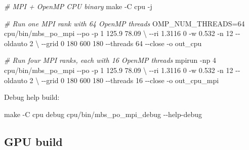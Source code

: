 \documentclass[
  10pt,
  a4paper,
]{article}
\newenvironment{Shaded}{}{}
\newcommand{\AttributeTok}[1]{\textcolor[rgb]{0.49,0.56,0.16}{#1}}
\newcommand{\CommentTok}[1]{\textcolor[rgb]{0.38,0.63,0.69}{\textit{#1}}}
\newcommand{\DataTypeTok}[1]{\textcolor[rgb]{0.56,0.13,0.00}{#1}}
\newcommand{\ExtensionTok}[1]{#1}
\newcommand{\FunctionTok}[1]{\textcolor[rgb]{0.02,0.16,0.49}{#1}}
\newcommand{\NormalTok}[1]{#1}
\newcommand{\OperatorTok}[1]{\textcolor[rgb]{0.40,0.40,0.40}{#1}}
\newcommand{\VariableTok}[1]{\textcolor[rgb]{0.10,0.09,0.49}{#1}}
\begin{document}
\begin{Shaded}
\begin{Highlighting}[]
\CommentTok{\# MPI + OpenMP CPU binary}
\FunctionTok{make} \AttributeTok{{-}C}\NormalTok{ cpu }\AttributeTok{{-}j}

\CommentTok{\# Run one MPI rank with 64 OpenMP threads}
\VariableTok{OMP\_NUM\_THREADS}\OperatorTok{=}\NormalTok{64 }\ExtensionTok{cpu/bin/mbs\_po\_mpi} \AttributeTok{{-}{-}po} \AttributeTok{{-}p}\NormalTok{ 1 125.9 78.09 }\DataTypeTok{\textbackslash{}}
    \AttributeTok{{-}{-}ri}\NormalTok{ 1.3116 0 }\AttributeTok{{-}w}\NormalTok{ 0.532 }\AttributeTok{{-}n}\NormalTok{ 12 }\AttributeTok{{-}{-}oldauto}\NormalTok{ 2 }\DataTypeTok{\textbackslash{}}
    \AttributeTok{{-}{-}grid}\NormalTok{ 0 180 600 180 }\AttributeTok{{-}{-}threads}\NormalTok{ 64 }\AttributeTok{{-}{-}close} \AttributeTok{{-}o}\NormalTok{ out\_cpu}

\CommentTok{\# Run four MPI ranks, each with 16 OpenMP threads}
\ExtensionTok{mpirun} \AttributeTok{{-}np}\NormalTok{ 4 cpu/bin/mbs\_po\_mpi }\AttributeTok{{-}{-}po} \AttributeTok{{-}p}\NormalTok{ 1 125.9 78.09 }\DataTypeTok{\textbackslash{}}
    \AttributeTok{{-}{-}ri}\NormalTok{ 1.3116 0 }\AttributeTok{{-}w}\NormalTok{ 0.532 }\AttributeTok{{-}n}\NormalTok{ 12 }\AttributeTok{{-}{-}oldauto}\NormalTok{ 2 }\DataTypeTok{\textbackslash{}}
    \AttributeTok{{-}{-}grid}\NormalTok{ 0 180 600 180 }\AttributeTok{{-}{-}threads}\NormalTok{ 16 }\AttributeTok{{-}{-}close} \AttributeTok{{-}o}\NormalTok{ out\_cpu\_mpi}
\end{Highlighting}
\end{Shaded}

Debug help build:

\begin{Shaded}
\begin{Highlighting}[]
\FunctionTok{make} \AttributeTok{{-}C}\NormalTok{ cpu debug}
\ExtensionTok{cpu/bin/mbs\_po\_mpi\_debug} \AttributeTok{{-}{-}help{-}debug}
\end{Highlighting}
\end{Shaded}

\subsection{GPU build}\label{gpu-build}
\end{document}
